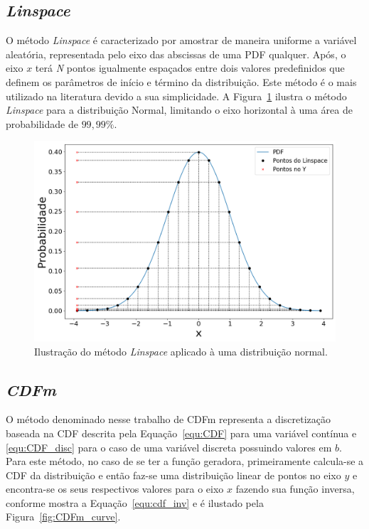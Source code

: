 \subsection{\textit{Linspace}}
O método \textit{Linspace} é caracterizado por amostrar de maneira uniforme a variável aleatória, representada pelo eixo das abscissas de uma \ac{PDF} qualquer. Após, o eixo $ x $ terá \textit{N} pontos igualmente espaçados entre dois valores predefinidos que definem os parâmetros de início e término da distribuição. Este método é o mais utilizado na literatura devido a sua simplicidade. A Figura~\ref{fig:linspace_curve} ilustra o método \textit{Linspace} para a distribuição Normal, limitando o eixo horizontal à uma área de probabilidade de $99,99\%$.


\begin{figure}[H]
	\centering
	\includegraphics[width=0.7\linewidth]{./figuras/normal_1}
	\caption{Ilustração do método \textit{Linspace} aplicado à uma distribuição normal.}
	\label{fig:linspace_curve}
\end{figure}


\subsection{\textit{CDFm}}
O método denominado nesse trabalho de \ac{CDFm} representa a discretização baseada na \ac{CDF} descrita pela Equação~\eqref{equ:CDF} para uma variável contínua e \eqref{equ:CDF_disc} para o caso de uma variável discreta possuindo valores em $ b $. Para este método, no caso de se ter a função geradora, primeiramente calcula-se a \ac{CDF} da distribuição e então faz-se uma distribuição linear de pontos no eixo $ y $ e encontra-se os seus respectivos valores para o eixo $ x $ fazendo sua função inversa, conforme mostra a Equação~\eqref{equ:cdf_inv} e é ilustado pela Figura~\ref{fig:CDFm_curve}.



